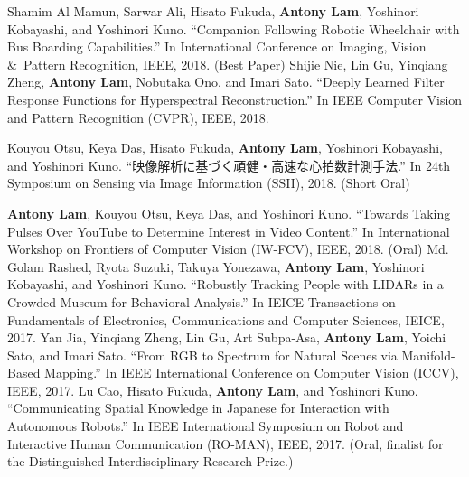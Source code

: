 \documentclass[letterpaper,10pt]{article}
\begin{document}
Shamim Al Mamun, Sarwar Ali, Hisato Fukuda, \textbf{Antony Lam}, Yoshinori Kobayashi, and Yoshinori Kuno. ``Companion Following Robotic Wheelchair with Bus Boarding Capabilities.'' In International Conference on Imaging, Vision \&\ Pattern Recognition, IEEE, 2018. (Best Paper) \vspace{0.05in}\newline
Shijie Nie, Lin Gu, Yinqiang Zheng, \textbf{Antony Lam}, Nobutaka Ono, and Imari Sato. ``Deeply Learned Filter Response Functions for Hyperspectral Reconstruction.'' In IEEE Computer Vision and Pattern Recognition (CVPR), IEEE, 2018.\vspace{0.05in}\newline
\begin{CJK}{UTF8}{min}Kouyou Otsu, Keya Das, Hisato Fukuda, \textbf{Antony Lam}, Yoshinori Kobayashi, and Yoshinori Kuno. ``映像解析に基づく頑健・高速な心拍数計測手法.'' In 24th Symposium on Sensing via Image Information (SSII), 2018. (Short Oral)\end{CJK}\vspace{0.05in}\newline
\textbf{Antony Lam}, Kouyou Otsu, Keya Das, and Yoshinori Kuno. ``Towards Taking Pulses Over YouTube to Determine Interest in Video Content.'' In International Workshop on Frontiers of Computer Vision (IW-FCV), IEEE, 2018. (Oral)\vspace{0.05in}\newline\newline
Md. Golam Rashed, Ryota Suzuki, Takuya Yonezawa, \textbf{Antony Lam}, Yoshinori Kobayashi, and Yoshinori Kuno. ``Robustly Tracking People with LIDARs in a Crowded Museum for Behavioral Analysis.'' In IEICE Transactions on Fundamentals of Electronics, Communications and Computer Sciences, IEICE, 2017.\vspace{0.05in}\newline
Yan Jia, Yinqiang Zheng, Lin Gu, Art Subpa-Asa, \textbf{Antony Lam}, Yoichi Sato, and Imari Sato. ``From RGB to Spectrum for Natural Scenes via Manifold-Based Mapping.'' In IEEE International Conference on Computer Vision (ICCV), IEEE, 2017.\vspace{0.05in}\newline
Lu Cao, Hisato Fukuda, \textbf{Antony Lam}, and Yoshinori Kuno. ``Communicating Spatial Knowledge in Japanese for Interaction with Autonomous Robots.'' In IEEE International Symposium on Robot and Interactive Human Communication (RO-MAN), IEEE,
2017. (Oral, finalist for the Distinguished Interdisciplinary Research Prize.)\vspace{0.05in}\newline
\end{document}
